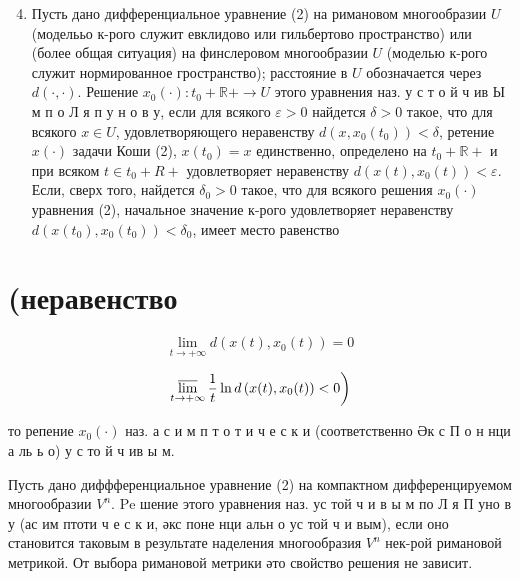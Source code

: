 \documentclass[10pt]{article}
\begin{document}
\begin{enumerate}

  \setcounter{enumi}{3}

  \item Пусть дано дифференциальное уравнение (2) на римановом многообразии $U$ (моделььо к-рого служит евклидово или гильбертово пространство) или (более общая ситуация) на финслеровом многообразии $U$ (моделью к-рого служит нормированное гространство); расстояние в $U$ обозначается через $d(\cdot, \cdot)$. Решение $x_{0}(\cdot): t_{0}+\mathbb{R}+\rightarrow U$ этого уравнения наз. у с т о й ч ив Ы м п о Л я п у н о в у, если для всякого $\varepsilon>0$ найдется $\delta>0$ такое, что для всякого $x \in U$, удовлетворяющего неравенству $d\left(x, x_{0}\left(t_{0}\right)\right)<\delta$, ретение $x(\cdot)$ задачи Коши (2), $x\left(t_{0}\right)=x$ единственно, определено на $t_{0}+\mathbb{R}+$ и при всяком $t \in t_{0}+R+$ удовлетворяет неравенству $d\left(x(t), x_{0}(t)\right)<\varepsilon$. Если, сверх того, найдется $\delta_{0}>0$ такое, что для всякого решения $x_{0}(\cdot)$ уравнения (2), начальное значение к-рого удовлетворяет неравенству $d\left(x\left(t_{0}\right), x_{0}\left(t_{0}\right)\right)<\delta_{0}$, имеет место равенство

\end{enumerate}



\section{(неравенство}

\[

\lim _{t \rightarrow+\infty} d\left(x(t), x_{0}(t)\right)=0

\]



\[

\left.\varlimsup_{t \rightarrow+\infty} \frac{1}{t} \ln d\left(x(t), x_{0}(t)\right)<0\right)

\]



то репение $x_{0}(\cdot)$ наз. а с и м п т о т и ч е с к и (соответственно Әк с П о н нци а ль ь о) у с то й ч ив ы м.



Пусть дано диффференциальное уравнение (2) на компактном дифференцируемом многообразии $V^{n}$. $\mathrm{Pe}$ шение этого уравнения наз. ус той ч и в ы м по Л я П уно в у (ас им птоти ч е с к и, әкс поне нци альн о ус той ч и вым), если оно становится таковым в результате наделения многообразия $V^{n}$ нек-рой римановой метрикой. От выбора римановой метрики әто свойство решения не зависит.
\end{document}
